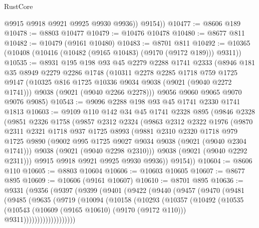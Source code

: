 \begin{lexlean}{RustCore}
\begin{coremodule}
            @9915
            @9918
            @9921
            @9925
            @9930
            @9936))
        @9154))
@10477 := @8606 @189
@10478 := @8803 @10477
@10479 := @10476 @10478
@10480 := @8677 @811
@10482 := @10479 (@9161 @10480)
@10483 := @8701 @811
@10492 := @10365 (@10408 (@10416 (@10482 (@9165 @10483) (@9170 (@9172 @189))) @9311))
@10535 := @8931
    @195
    @198
    @93
    @45
    @2279
    @2288
    @1741
    @2333
    (@8946
      @181
      @35
      @8949
      @2279
      @2286
      @1748
      (@10311
        @2278
        @2285
        @1718
        @759
        @1725
        @9147
        (@10325 @816 @1725 @10336 @9034 @9038 (@9021 (@9040 @2272 @1741)))
        @9038
        (@9021 (@9040 @2266 @2278)))
      @9056
      @9060
      @9065
      @9070
      @9076
      @9085)
@10543 := @9096 @2288 @198 @93 @45 @1741 @2330 @1741 @1813
@10603 := @9109
    @110
    @142
    @34
    @45
    @1741
    @2328
    @895
    (@9846
      @2328
      (@9851
        @2326
        @1758
        (@9857
          @2312
          @2324
          (@9863
            @2312
            @2322
            @1976
            (@9870
              @2311
              @2321
              @1718
              @937
              @1725
              @8993
              (@9881
                @2310
                @2320
                @1718
                @979
                @1725
                @9890
                (@9002 @995 @1725 @9027 @9034 @9038 (@9021 (@9040 @2304 @1741)))
                @9038
                (@9021 (@9040 @2298 @2310)))
              @9038
              (@9021 (@9040 @2292 @2311)))
            @9915
            @9918
            @9921
            @9925
            @9930
            @9936))
        @9154))
@10604 := @8606 @110
@10605 := @8803 @10604
@10606 := @10603 @10605
@10607 := @8677 @895
@10609 := @10606 (@9161 @10607)
@10610 := @8701 @895
@10636 := @9331
    (@9356
      (@9397
        (@9399
          (@9401
            (@9422
              (@9440
                (@9457
                  (@9470
                    (@9481
                      (@9485
                        (@9635
                          (@9719
                            (@10094
                              (@10158
                                (@10293
                                  (@10357
                                    (@10492
                                      (@10535
                                        (@10543
                                          (@10609 (@9165 @10610) (@9170 (@9172 @110)))
                                          @9311)))))))))))))))))))

\end{coremodule}
\end{lexlean}
